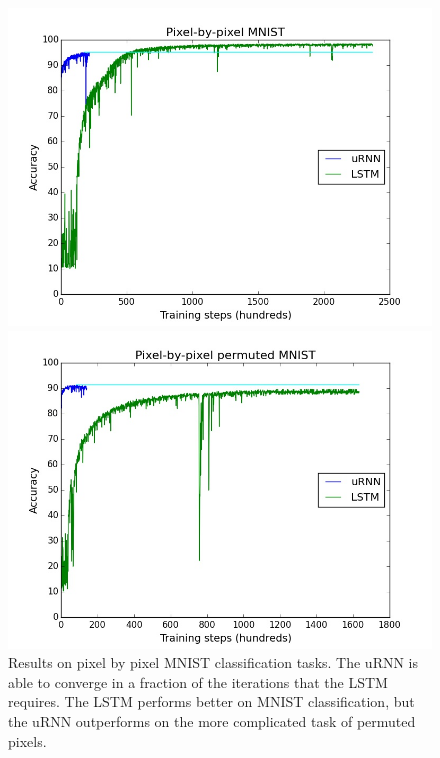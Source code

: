 \documentclass{article} %
\begin{document}
\begin{figure}[t!] 
  \begin{minipage}[b]{0.5\linewidth}
    \centering
    \includegraphics[scale=0.25]{figures/mnist.jpeg}
  \end{minipage}%
  \begin{minipage}[b]{0.5\linewidth}
    \centering
    \includegraphics[scale=0.25]{figures/mnist_perm.jpeg}
  \end{minipage}
  \caption{Results on pixel by pixel MNIST classification tasks. 
           The uRNN is able to converge in a fraction of the iterations
	    that the LSTM requires. The LSTM performs better on MNIST classification, 
	    but the uRNN outperforms on the more complicated task
	    of permuted pixels.}
  \label{fig3} 
\end{figure}
\end{document}
